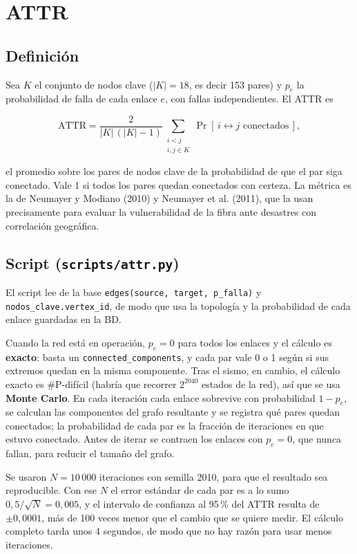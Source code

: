 \documentclass[11pt,a4paper]{article}
\newcommand{\cod}[1]{\texttt{#1}}
\begin{document}
\section{ATTR}
\subsection{Definición}
Sea $K$ el conjunto de nodos clave ($|K| = 18$, es decir 153 pares) y $p_e$ la probabilidad de falla
de cada enlace $e$, con fallas independientes. El ATTR es

\begin{equation}
\mathrm{ATTR} = \frac{2}{|K|\,(|K|-1)} \sum_{\substack{i<j\\ i,j \in K}} \Pr\left[\, i \leftrightarrow j \text{ conectados} \,\right],
\end{equation}

el promedio sobre los pares de nodos clave de la probabilidad de que el par siga conectado. Vale 1 si
todos los pares quedan conectados con certeza. La métrica es la de Neumayer y Modiano (2010) y
Neumayer et al. (2011), que la usan precisamente para evaluar la vulnerabilidad de la fibra ante
desastres con correlación geográfica.

\subsection{Script (\cod{scripts/attr.py})}
El script lee de la base \cod{edges(source, target, p\_falla)} y \cod{nodos\_clave.vertex\_id}, de
modo que usa la topología y la probabilidad de cada enlace guardadas en la BD.

Cuando la red está en operación, $p_e = 0$ para todos los enlaces y el cálculo es \textbf{exacto}:
basta un \cod{connected\_components}, y cada par vale 0 o 1 según si sus extremos quedan en la misma
componente. Tras el sismo, en cambio, el cálculo exacto es \#P-difícil (habría que recorrer $2^{2040}$
estados de la red), así que se usa \textbf{Monte Carlo}. En cada iteración cada enlace sobrevive con
probabilidad $1-p_e$, se calculan las componentes del grafo resultante y se registra qué pares quedan
conectados; la probabilidad de cada par es la fracción de iteraciones en que estuvo conectado. Antes de
iterar se contraen los enlaces con $p_e = 0$, que nunca fallan, para reducir el tamaño del grafo.

Se usaron $N = 10\,000$ iteraciones con semilla 2010, para que el resultado sea reproducible. Con ese
$N$ el error estándar de cada par es a lo sumo $0{,}5/\sqrt{N} = 0{,}005$, y el intervalo de confianza
al 95\,\% del ATTR resulta de $\pm 0{,}0001$, más de 100 veces menor que el cambio que se quiere medir.
El cálculo completo tarda unos 4 segundos, de modo que no hay razón para usar menos iteraciones.
\end{document}
